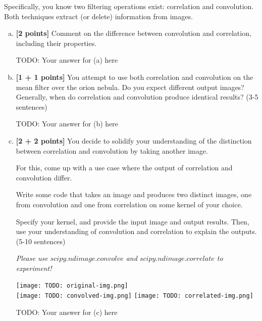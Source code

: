 Specifically, you know two filtering operations exist: correlation and convolution. Both techniques extract (or delete) information from images.

\begin{enumerate}[(a)]
    \item \textbf{[2 points]} Comment on the difference between convolution and correlation, including their properties. 
    
    \begin{mdframed}
        TODO: Your answer for (a) here
    \end{mdframed}
    
    \item \textbf{[1 + 1 points]} You attempt to use both correlation and convolution on the mean filter over the orion nebula. Do you expect different output images? Generally, when do correlation and convolution produce identical results? (3-5 sentences)
    
    \begin{mdframed}
        TODO: Your answer for (b) here
    \end{mdframed}

    \item \textbf{[2 + 2 points]}
    You decide to solidify your understanding of the distinction between correlation and convolution by taking another image.
    
    For this, come up with a use case where the output of correlation and convolution differ.
    
    Write some code that takes an image and produces two distinct images, one from convolution and one from correlation on some kernel of your choice. 
    
    Specify your kernel, and provide the input image and output results. Then, use your understanding of convolution and correlation to explain the outputs. (5-10 sentences)
    
    \emph{Please use \href{https://docs.scipy.org/doc/scipy/reference/generated/scipy.ndimage.convolve.html}{$scipy.ndimage.convolve$} and \href{https://docs.scipy.org/doc/scipy/reference/generated/scipy.ndimage.correlate.html}{$scipy.ndimage.correlate$} to experiment!}

    \texttt{[image: TODO: original-img.png]}\\
    \texttt{[image: TODO: convolved-img.png]}
    \texttt{[image: TODO: correlated-img.png]}
    
    \begin{mdframed}
        TODO: Your answer for (c) here
    \end{mdframed}

\end{enumerate}


